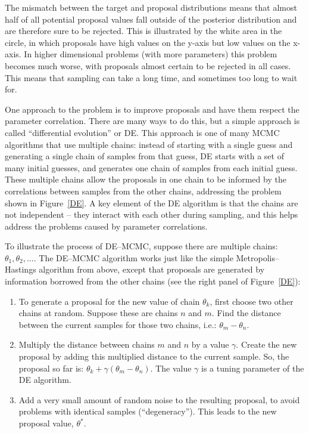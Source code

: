 The mismatch between the target and proposal distributions means that almost half of all potential proposal values fall outside of the posterior distribution and are therefore sure to be rejected. This is illustrated by the white area in the circle, in which proposals have high values on the y-axis but low values on the x-axis. In higher dimensional problems (with more parameters) this problem becomes much worse, with proposals almost certain to be rejected in all cases. This means that sampling can take a long time, and sometimes too long to wait for.

One approach to the problem is to improve proposals and have them respect the parameter correlation. There are many ways to do this, but a simple approach is called ``differential evolution'' or DE. This approach is one of many MCMC algorithms that use multiple chains: instead of starting with a single guess and generating a single chain of samples from that guess, DE starts with a set of many initial guesses, and generates one chain of samples from each initial guess. These multiple chains allow the proposals in one chain to be informed by the correlations between samples from the other chains, addressing the problem shown in Figure~\ref{DE}. A key element of the DE algorithm is that the chains are not independent -- they interact with each other during sampling, and this helps address the problems caused by parameter correlations.

To illustrate the process of DE--MCMC, suppose there are multiple chains: $\theta_1, \theta_2, ...$. The DE--MCMC algorithm works just like the simple Metropolis--Hastings algorithm from above, except that proposals are generated by information borrowed from the other chains (see the right panel of Figure~\ref{DE}):
\begin{enumerate}
	\item{} To generate a proposal for the new value of chain $\theta_k$, first choose two other chains at random. Suppose these are chains $n$ and $m$. Find the distance between the current samples for those two chains, i.e.: $\theta_m - \theta_n$. 
	\item{} Multiply the distance between chains $m$ and $n$ by a value $\gamma$. Create the new proposal by adding this multiplied distance to the current sample. So, the proposal so far is: $\theta_k + \gamma(\theta_m-\theta_n)$. The value $\gamma$ is a tuning parameter of the DE algorithm.
	\item{} Add a very small amount of random noise to the resulting proposal, to avoid problems with identical samples (``degeneracy''). This leads to the new proposal value, $\theta^*$.
\end{enumerate}

